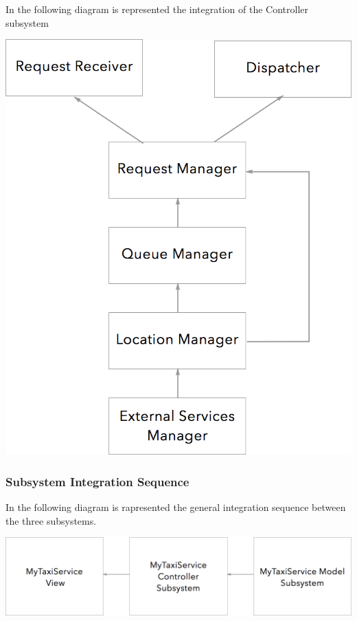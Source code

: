 \documentclass[11pt,titlepage]{article} %
\begin{document}
\newpage

     \noindent In the following diagram is represented the integration of the Controller subsystem\newline
    \begin{center}
      \includegraphics[scale=0.3]{Integration-2.png}
    \end{center}
  \subsubsection{Subsystem Integration Sequence}
    In the following diagram is rapresented the general integration sequence between the three subsystems.
    \begin{center}
      \includegraphics[scale=0.3]{Integration-3.png}
    \end{center}
\end{document}
